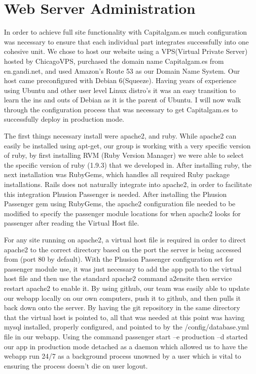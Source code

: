 \section{Web Server Administration}

In order to achieve full site functionality with Capitalgam.es much configuration was necessary to ensure that each individual part integrates successfully into one cohesive unit. We chose to host our website using a VPS(Virtual Private Server) hosted by ChicagoVPS, purchased the domain name Capitalgam.es from en.gandi.net, and used Amazon's Route 53 as our Domain Name System. Our host came preconfigured with Debian 6(Squeeze).  Having years of experience using Ubuntu and other user level Linux distro's it was an easy transition to learn the ins and outs of Debian as it is the parent of Ubuntu.  I will now walk through the configuration process that was necessary to get Capitalgam.es to successfully deploy in production mode.

The first things necessary install were apache2, and ruby. While apache2 can easily be installed using apt-get, our group is working with a very specific version of ruby, by first installing RVM (Ruby Version Manager) we were able to select the specific version of ruby (1.9.3) that we developed in.  After installing ruby, the next installation was RubyGems, which handles all required Ruby package installations.
Rails does not naturally integrate into apache2, in order to facilitate this integration Phusion Passenger is needed.  After installing the Phusion Passenger gem using RubyGems, the apache2 configuration file needed to be modified to specify the passenger module locations for when apache2 looks for passenger after reading the Virtual Host file.

For any site running on apache2, a virtual host file is required in order to direct apache2 to the correct directory based on the port the server is being accessed from (port 80 by default).  With the Phusion Passenger configuration set for passenger module use, it was just necessary to add the app path to the virtual host file and then use the standard apache2 command a2ensite then service restart apache2 to enable it.  By using github, our team was easily able to update our webapp locally on our own computers, push it to github, and then pulls it back down onto the server.  By having the git repository in the same directory that the virtual host is pointed to, all that was needed at this point was having mysql installed, properly configured, and pointed to by the /config/database.yml file in our webapp.  Using the command passenger start –e production –d started our app in production mode detached as a daemon which allowed us to have the webapp run 24/7 as a background process unowned by a user which is vital to ensuring the process doesn’t die on user logout.

